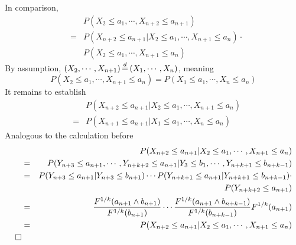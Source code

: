 \documentclass{report}
\begin{document}
\begin{enumerate}[1.]
\begin{enumerate}[(a)]
    In comparison,
    \begin{eqnarray*}
      && P(X_2 \le a_1, \cdots, X_{n+2} \le a_{n+1}) \\
      &=& P(X_{n+2} \le a_{n+1} | X_2 \le a_1, \cdots, X_{n+1} \le
      a_{n}) \cdot \\
      && P(X_2 \le a_1, \cdots, X_{n+1} \le a_{n})
    \end{eqnarray*}
    By assumption, $(X_2, \cdots, X_{n+1}) \ed (X_1, \cdots, X_{n})$,
    meaning
    \[
    P(X_2 \le a_1, \cdots, X_{n+1} \le a_{n}) = P(X_1 \le
    a_1, \cdots, X_{n} \le a_{n})
    \]
    It remains to establish
    \begin{eqnarray*}
    && P(X_{n+2} \le a_{n+1} | X_2 \le a_1, \cdots, X_{n+1} \le
    a_{n}) \\
    &=& P(X_{n+1} \le a_{n+1} | X_1 \le a_1, \cdots, X_{n} \le
    a_{n})
    \end{eqnarray*}
    Analogous to the calculation before
    \begin{eqnarray*}
      && P(X_{n+2} \le a_{n+1} | X_2 \le a_1, \cdots, X_{n+1} \le
      a_{n})      \\
      &=& P(Y_{n+3} \le a_{n+1}, \cdots, Y_{n+k+2} \le a_{n+1} | Y_3
      \le b_1, \cdots, Y_{n+k+1} \le b_{n+k-1}) \\
      &=& P(Y_{n+3} \le a_{n+1} | Y_{n+3} \le b_{n+1}) \cdots
      P(Y_{n+k+1} \le a_{n+1} | Y_{n+k+1} \le b_{n+k-1}) \cdot \\
      && P(Y_{n+k+2} \le a_{n+1}) \\
      &=& {F^{1/k}(a_{n+1} \wedge b_{n+1}) \over F^{1/k}(b_{n+1})} \cdots
      {F^{1/k}(a_{n+1} \wedge b_{n+k-1}) \over F^{1/k}(b_{n+k-1})}
      F^{1/k}(a_{n+1}) \\
      &=& P(X_{n+2} \le a_{n+1} | X_2 \le a_1, \cdots, X_{n+1} \le
      a_{n})\\
      \Box
    \end{eqnarray*}



\end{enumerate}
\end{enumerate}
\end{document}
